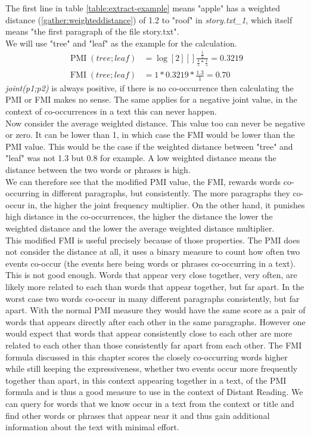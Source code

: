 The first line in table \ref{table:extract-example} means "apple" has a weighted distance (\ref{gather:weighteddistance}) of 1.2 to "roof" in \textit{story.txt\_1}, which itself means "the first paragraph of the file story.txt".\\
We will use "tree" and "leaf" as the example for the calculation.\\
\begin{equation}\label{gather:fmiexample}
\begin{aligned}
\operatorname{PMI}(tree;leaf) &= \log[2][]{\frac{\frac{1}{5}}{\frac{4}{5} * \frac{1}{5}}} = 0.3219 \\
\operatorname {FMI}(tree;leaf) &= 1 * 0.3219 * \frac{1.3}{1} = 0.70
\end{aligned}
\end{equation}
\textit{joint(p1;p2)} is always positive, if there is no co-occurrence then calculating the PMI or FMI makes no sense. The same applies for a negative joint value, in the context of co-occurrences in a text this can never happen.\\
Now consider the average weighted distance. This value too can never be negative or zero. It can be lower than 1, in which case the FMI would be lower than the PMI value. This would be the case if the weighted distance between "tree" and "leaf" was not 1.3 but 0.8 for example. A low weighted distance means the distance between the two words or phrases is high.\\
We can therefore see that the modified PMI value, the FMI, rewards words co-occurring in different paragraphs, but consistently. The more paragraphs they co-occur in, the higher the joint frequency multiplier. On the other hand, it punishes high distance in the co-occurrences, the higher the distance the lower the weighted distance and the lower the average weighted distance multiplier.\\
This modified FMI is useful precisely because of those properties. The PMI does not consider the distance at all, it uses a binary measure to count how often two events co-occur (the events here being words or phrases co-occurring in a text). This is not good enough. Words that appear very close together, very often, are likely more related to each than words that appear together, but far apart. In the worst case two words co-occur in many different paragraphs consistently, but far apart. With the normal PMI measure they would have the same score as a pair of words that appears directly after each other in the same paragraphs. However one would expect that words that appear consistently close to each other are more related to each other than those consistently far apart from each other. The FMI formula discussed in this chapter scores the closely co-occurring words higher while still keeping the expressiveness, whether two events occur more frequently together than apart, in this context appearing together in a text, of the PMI formula and is thus a good measure to use in the context of Distant Reading. We can query for words that we know occur in a text from the context or title and find other words or phrases that appear near it and thus gain additional information about the text with minimal effort.

